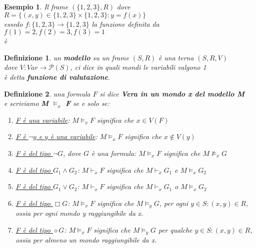 \documentclass[a4paper,12pt]{article}
\theoremstyle{def}
\newtheorem*{definition}{Definizione}
\theoremstyle{prop}
\theoremstyle{esempio}
\newtheorem*{example}{Esempio}
\theoremstyle{dimostrazione}
\theoremstyle{teo}
\theoremstyle{osservazione}
\begin{document}
\begin{example}
	Il frame \((\{1,2,3\}, R)\) dove \(R = \{(x,y) \in \{1,2,3\} \times \{1,2,3\} : y=f(x)\}\)\\
	essedo \(f : \{1,2,3\} \rightarrow \{1,2,3\}\) la funzione definita da \(f(1) = 2, f(2) = 3, f(3) = 1\)\\
	è 
	\begin{center}
	\end{center}
\end{example}
\begin{definition}
	un \textbf{modello} su un frame \((S,R)\) è una terna \((S,R,V)\)\\
	dove \(V : Var \rightarrow \mathcal{P}(S) \), ci dice in quali mondi le variabili valgono 1\\
	è detta \textbf{funzione di valutazione}.
\end{definition}
\begin{definition}
	una formula \(F\) si dice \textbf{Vera in un mondo x del modello M}\\
	e scriviamo \textbf{M \(\vDash_x\) F} se e solo se:
	\begin{enumerate}
		\item \underline{F è una variabile}: \(M \vDash_x F\) significa che \(x \in V(F)\)
		\item \underline{ F è \(\neg y\) e \(y\) è una variabile}: \(M \vDash_x F\) significa che \(x \notin V(y)\)
		\item \underline{F è del tipo \(\neg G\)}, dove \(G\) è una formula: \(M \vDash_x F\) significa che \(M \nvDash_x G\)
		\item \underline{F è del tipo \(G_1 \land G_2\)}: \(M \vdash_x F\) significa che \(M \vdash_x G_1\) e \(M \vDash_x G_2\)
		\item \underline{F è del tipo \(G_1 \lor G_2\)}: \(M \vdash_x F\) significa che \(M \vdash_x G_1\) o \(M \vDash_x G_2\)
		\item \underline{F è del tipo \(\Box G\)}: \(M \vDash_x F\) significa che \(M \vDash_y G\), per ogni \(y \in S : (x,y) \in R\),\\
				ossia per ogni mondo y raggiungibile da x.
		\item \underline{F è del tipo \(\diamond G\)}: \(M \vDash_x F\) significa che \(M \vDash_y G\) per qualche \(y \in S : (x,y) \in R\),\\
				ossia per almeno un mondo raggiungibile da x.
	\end{enumerate} 
\end{definition}
\end{document}
